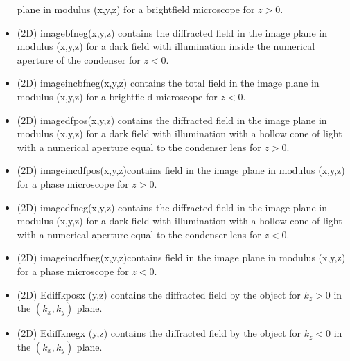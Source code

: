 \begin{itemize}
  plane in modulus (x,y,z) for a brightfield microscope for $z>0$.
\item (2D) imagebfneg(x,y,z) contains the diffracted field in the
  image plane in modulus (x,y,z) for a dark field with illumination
  inside the numerical aperture of the condenser for $z<0$.
\item (2D) imageincbfneg(x,y,z) contains the total field in the image
  plane in modulus (x,y,z) for a brightfield microscope for $z<0$.
\item (2D) imagedfpos(x,y,z) contains the diffracted field in the
  image plane in modulus (x,y,z) for a dark field with illumination
  with a hollow cone of light with a numerical aperture equal to the
  condenser lens for $z>0$.
\item (2D) imageincdfpos(x,y,z)contains field in the image plane in
  modulus (x,y,z) for a phase microscope for $z>0$.
\item (2D) imagedfneg(x,y,z) contains the diffracted field in the
  image plane in modulus (x,y,z) for a dark field with illumination
  with a hollow cone of light with a numerical aperture equal to the
  condenser lens for $z<0$.
\item (2D) imageincdfneg(x,y,z)contains field in the image plane in
  modulus (x,y,z) for a phase microscope for $z<0$.
\item (2D) Ediffkposx (y,z) contains the diffracted field by the
  object for $k_z>0$ in the $(k_x,k_y)$ plane.
\item (2D) Ediffknegx (y,z) contains the diffracted field by the
  object for $k_z<0$ in the $(k_x,k_y)$ plane.

  
\end{itemize}


